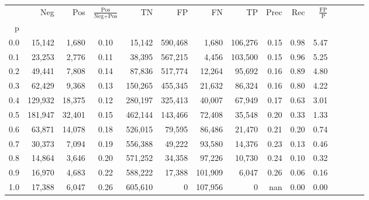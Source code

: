 \begin{tabular}{rrrcrrrrrrrrrrr}
\toprule
{} &      Neg &     Pos & $\frac{\text{Pos}}{\text{Neg}+\text{Pos}}$ &       TN &       FP &       FN &       TP &  Prec &   Rec & $\frac{\text{FP}}{\text{P}}$ \\
p   &          &         &                                            &          &          &          &          &       &       &                              \\
\midrule
0.0 &   15,142 &   1,680 &                                       0.10 &   15,142 &  590,468 &    1,680 &  106,276 &  0.15 &  0.98 &                         5.47 \\
0.1 &   23,253 &   2,776 &                                       0.11 &   38,395 &  567,215 &    4,456 &  103,500 &  0.15 &  0.96 &                         5.25 \\
0.2 &   49,441 &   7,808 &                                       0.14 &   87,836 &  517,774 &   12,264 &   95,692 &  0.16 &  0.89 &                         4.80 \\
0.3 &   62,429 &   9,368 &                                       0.13 &  150,265 &  455,345 &   21,632 &   86,324 &  0.16 &  0.80 &                         4.22 \\
0.4 &  129,932 &  18,375 &                                       0.12 &  280,197 &  325,413 &   40,007 &   67,949 &  0.17 &  0.63 &                         3.01 \\
0.5 &  181,947 &  32,401 &                                       0.15 &  462,144 &  143,466 &   72,408 &   35,548 &  0.20 &  0.33 &                         1.33 \\
0.6 &   63,871 &  14,078 &                                       0.18 &  526,015 &   79,595 &   86,486 &   21,470 &  0.21 &  0.20 &                         0.74 \\
0.7 &   30,373 &   7,094 &                                       0.19 &  556,388 &   49,222 &   93,580 &   14,376 &  0.23 &  0.13 &                         0.46 \\
0.8 &   14,864 &   3,646 &                                       0.20 &  571,252 &   34,358 &   97,226 &   10,730 &  0.24 &  0.10 &                         0.32 \\
0.9 &   16,970 &   4,683 &                                       0.22 &  588,222 &   17,388 &  101,909 &    6,047 &  0.26 &  0.06 &                         0.16 \\
1.0 &   17,388 &   6,047 &                                       0.26 &  605,610 &        0 &  107,956 &        0 &   nan &  0.00 &                         0.00 \\
\bottomrule
\end{tabular}
